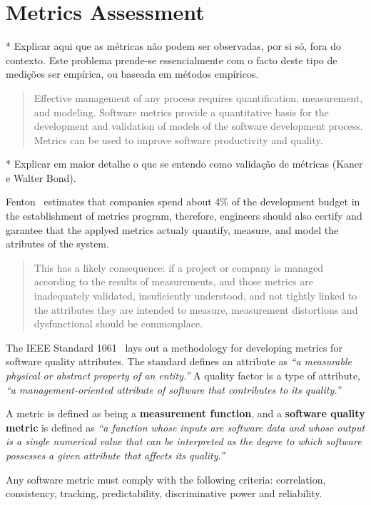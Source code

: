 \section{Metrics Assessment} \label{assess}





    * Explicar aqui que as métricas não podem ser observadas, por si só, fora do contexto. Este problema prende-se essencialmente com o facto deste tipo de medições ser empírica, ou baseada em métodos empíricos.

\begin{quotation}
	Effective management of any process requires quantification, measurement, and modeling. Software metrics provide a quantitative basis for the development and validation of models of the software development process. Metrics can be used to improve software productivity and quality.~\cite{g1:Millis:1998}
\end{quotation}

    * Explicar em maior detalhe o que se entendo como validação de métricas (Kaner e Walter Bond).


\par Fenton~\cite{g1:Fenton:1999} estimates that companies spend about 4\% of the development budget in the establishment of metrics program, therefore, engineers should also certify and garantee that the applyed metrics actualy quantify, measure, and model the atributes of the system.
\begin{quotation}
	This has a likely consequence: if a project or company is managed according to the results of measurements, and those metrics are inadequately validated, insuficiently understood, and not tightly linked to the attributes they are intended to measure, measurement distortions and dysfunctional should be commonplace.~\cite{g1:kaner:2004}
\end{quotation}


\par The IEEE Standard 1061~\cite{g1:Ieee1061:1998} lays out a methodology for developing metrics for software quality attributes. The standard defines an attribute as \emph{``a measurable physical or abstract property of an entity.''} A quality factor is a type of attribute, \emph{``a management-oriented attribute of software that contributes to its quality.''}

\par A metric is defined as being a {\bf measurement function}, and a {\bf software quality metric} is defined as \emph{``a function whose inputs are software data and whose output is a single numerical value that can be interpreted as the degree to which software possesses a given attribute that affects its quality.''}

\par Any software metric must comply with the following criteria: correlation, consistency, tracking, predictability, discriminative power and reliability.
